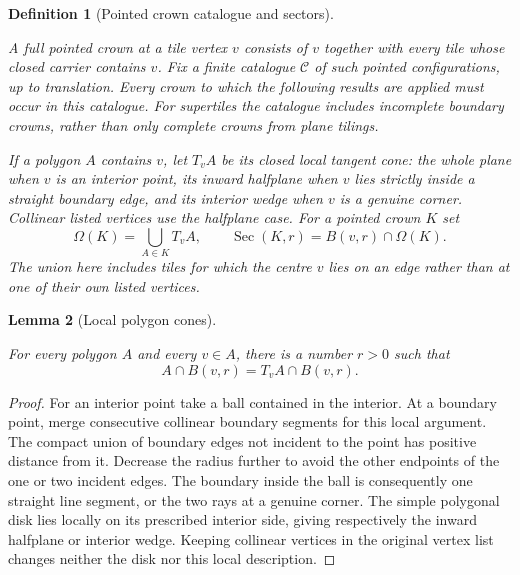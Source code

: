 \documentclass[11pt,a4paper]{article}
\newtheorem{definition}{Definition}[section]
\newtheorem{lemma}[definition]{Lemma}
\theoremstyle{remark}
\newcommand{\lean}[1]{}
\newcommand{\uses}[1]{}
\begin{document}
\begin{definition}[Pointed crown catalogue and sectors]
\label{def:crown-sector}
\lean{Tilings.Crowns.pointedCatalogue}
\uses{def:polygon,def:protoset,def:placed,def:tiling,def:crown,def:flc}
A \emph{full pointed crown} at a tile vertex $v$ consists of $v$ together
with every tile whose closed carrier contains $v$.  Fix a finite catalogue
$\mathcal C$ of such pointed configurations, up to translation.  Every crown
to which the following results are applied must occur in this catalogue.
For supertiles the catalogue includes incomplete boundary crowns, rather
than only complete crowns from plane tilings.

If a polygon $A$ contains $v$, let $T_vA$ be its closed local tangent cone:
the whole plane when $v$ is an interior point, its inward halfplane when
$v$ lies strictly inside a straight boundary edge, and its interior wedge
when $v$ is a genuine corner.  Collinear listed vertices use the halfplane
case.  For a pointed crown $K$ set
\[
  \Omega(K)=\bigcup_{A\in K}T_vA,
  \qquad \operatorname{Sec}(K,r)=B(v,r)\cap\Omega(K).
\]
The union here includes tiles for which the centre $v$ lies on an edge
rather than at one of their own listed vertices.
\end{definition}

\begin{lemma}[Local polygon cones]
\label{lem:polygon-local-cone}
\lean{Tilings.Crowns.polygonLocalCone}
\uses{def:polygon,def:placed,def:crown-sector}
For every polygon $A$ and every $v\in A$, there is a number $r>0$ such that
\[
  A\cap B(v,r)=T_vA\cap B(v,r).
\]
\end{lemma}
\begin{proof}
For an interior point take a ball contained in the interior.  At a boundary
point, merge consecutive collinear boundary segments for this local
argument.  The compact union of boundary edges not incident to the point
has positive distance from it.  Decrease the radius further to avoid the
other endpoints of the one or two incident edges.  The boundary inside the
ball is consequently one straight line segment, or the two rays at a
genuine corner.  The simple polygonal disk lies locally on its prescribed
interior side, giving respectively the inward halfplane or interior wedge.
Keeping collinear vertices in the original vertex list changes neither
the disk nor this local description.
\end{proof}
\end{document}
